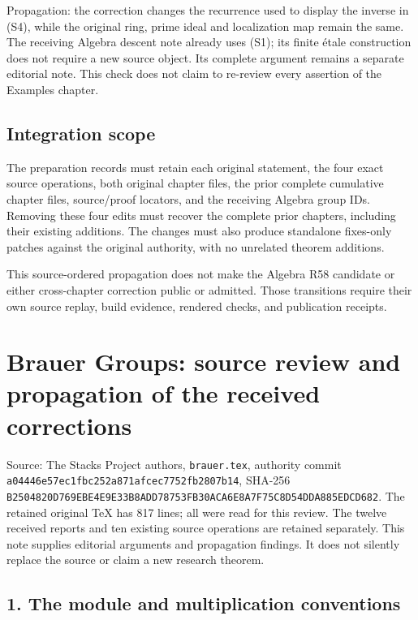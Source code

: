\documentclass[11pt]{article}
\begin{document}
Propagation: the correction changes the recurrence used to display the inverse in (S4), while the original ring, prime ideal and localization map remain the same. The receiving Algebra descent note already uses (S1); its finite étale construction does not require a new source object. Its complete argument remains a separate editorial note. This check does not claim to re-review every assertion of the Examples chapter.

\subsection{Integration scope}\label{integration-scope}

The preparation records must retain each original statement, the four exact source operations, both original chapter files, the prior complete cumulative chapter files, source/proof locators, and the receiving Algebra group IDs. Removing these four edits must recover the complete prior chapters, including their existing additions. The changes must also produce standalone fixes-only patches against the original authority, with no unrelated theorem additions.

This source-ordered propagation does not make the Algebra R58 candidate or either cross-chapter correction public or admitted. Those transitions require their own source replay, build evidence, rendered checks, and publication receipts.

\clearpage
\section{Brauer Groups: source review and propagation of the received corrections}\label{brauer-groups-source-review-and-propagation-of-the-received-corrections}

Source: The Stacks Project authors, \texttt{brauer.tex}, authority commit \texttt{a04446e5\allowbreak{}7ec1fbc2\allowbreak{}52a871af\allowbreak{}cec7752f\allowbreak{}b2807b14}, SHA-256 \texttt{B2504820\allowbreak{}D769EBE4\allowbreak{}E9E33B8A\allowbreak{}DD78753F\allowbreak{}B30ACA6E\allowbreak{}8A7F75C8\allowbreak{}D54DDA88\allowbreak{}5EDCD682}. The retained original TeX has 817 lines; all were read for this review. The twelve received reports and ten existing source operations are retained separately. This note supplies editorial arguments and propagation findings. It does not silently replace the source or claim a new research theorem.

\subsection{1. The module and multiplication conventions}\label{the-module-and-multiplication-conventions}
\end{document}
